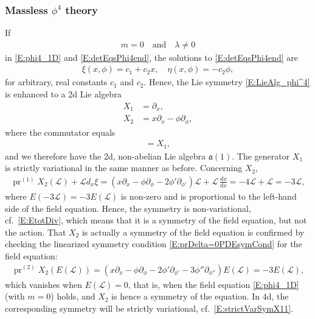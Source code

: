 \documentclass[a4paper,hidelinks, 12pt]{article}
\numberwithin{equation}{section}
\theoremstyle{plain}
\newcommand{\La}{\mathfrak}
\newcommand{\mc}{\mathcal}
\newcommand{\on}{\operatorname}
\begin{document}
	\subsubsection{Massless $\phi^4$ theory}
\label{sec:MasslessPhi4Theory}
	If 
	\begin{align}
		m=0 \quad \text{and} \quad \lambda\ne 0
	\end{align}
	in \eqref{E:phi4_1D} and \eqref{E:detEqsPhi4end}, 
	the solutions to \eqref{E:detEqsPhi4end} are
	\begin{align}
		\xi(x,\phi)=c_1+c_2 x,\quad \eta(x,\phi)= -c_2\phi, 
	\end{align}
	for arbitrary, real constants $c_1$ and $c_2$. 
	Hence, the Lie symmetry \eqref{E:LieAlg_phi^4} is enhanced to a 2d Lie algebra
\begin{align}
	 X_1 &=\partial_x , \nonumber  \\
 X_2 &= x\partial_x - \phi\partial_\phi, 
\end{align}
where the commutator equals
\begin{align}
	[X_1,X_2]=X_1,
\end{align}
and we therefore have the 2d, non-abelian Lie algebra $\La{a}(1)$. The generator $X_1$ is strictly variational in the same manner as before. Concerning $X_2$,
\begin{align}\label{E:prX21d}
	\on{pr}^{(1)}X_2(\mc{L})+ \mc{L}d_x \xi  =(x\partial_x-\phi \partial_\phi
	-2\phi'\partial_{\phi'})\mc{L}+\mc{L}\,\frac{d x}{dx}= -4\mc{L}+\mc{L}= -3\mc{L},
\end{align}
where $E(-3\mc{L})=-3E(\mc{L})$ is non-zero and is proportional to the left-hand side of the field equation. Hence, the symmetry is non-variational, cf.~\eqref{E:EtotDiv}, which means that it is a symmetry of the field equation, but not the action. That $X_2$ is actually a symmetry of the field equation is 
confirmed by
checking the linearized symmetry condition \eqref{E:prDelta=0PDEsymCond} for the field equation:
\begin{align}
	\on{pr}^{(2)}X_2 (E(\mc{L}))=(x\partial_x-\phi \partial_\phi
	-2\phi'\partial_{\phi'}-3\phi''\partial_{\phi''})E(\mc{L})=-3 E(\mc{L}),
\end{align}
 which vanishes when $E(\mc{\mc{L}})=0$, that is, when the field equation \eqref{E:phi4_1D} (with $m=0$) holds, and $X_2$ is hence a symmetry of the equation.
 In 4d, the corresponding symmetry will be strictly variational, cf.~\eqref{E:strictVarSymX11}.
\end{document}
